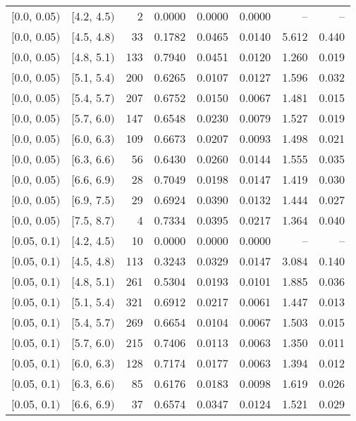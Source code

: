 \begin{longtable}{| l | l | r | r | r | r | r | r |}
        $[$0.0, 0.05$)$ & $[$4.2, 4.5$)$ & 2 & 0.0000 & 0.0000 & 0.0000 & -- & -- \\
        $[$0.0, 0.05$)$ & $[$4.5, 4.8$)$ & 33 & 0.1782 & 0.0465 & 0.0140 & 5.612 & 0.440 \\
        $[$0.0, 0.05$)$ & $[$4.8, 5.1$)$ & 133 & 0.7940 & 0.0451 & 0.0120 & 1.260 & 0.019 \\
        $[$0.0, 0.05$)$ & $[$5.1, 5.4$)$ & 200 & 0.6265 & 0.0107 & 0.0127 & 1.596 & 0.032 \\
        $[$0.0, 0.05$)$ & $[$5.4, 5.7$)$ & 207 & 0.6752 & 0.0150 & 0.0067 & 1.481 & 0.015 \\
        $[$0.0, 0.05$)$ & $[$5.7, 6.0$)$ & 147 & 0.6548 & 0.0230 & 0.0079 & 1.527 & 0.019 \\
        $[$0.0, 0.05$)$ & $[$6.0, 6.3$)$ & 109 & 0.6673 & 0.0207 & 0.0093 & 1.498 & 0.021 \\
        $[$0.0, 0.05$)$ & $[$6.3, 6.6$)$ & 56 & 0.6430 & 0.0260 & 0.0144 & 1.555 & 0.035 \\
        $[$0.0, 0.05$)$ & $[$6.6, 6.9$)$ & 28 & 0.7049 & 0.0198 & 0.0147 & 1.419 & 0.030 \\
        $[$0.0, 0.05$)$ & $[$6.9, 7.5$)$ & 29 & 0.6924 & 0.0390 & 0.0132 & 1.444 & 0.027 \\
        $[$0.0, 0.05$)$ & $[$7.5, 8.7$)$ & 4 & 0.7334 & 0.0395 & 0.0217 & 1.364 & 0.040 \\
        $[$0.05, 0.1$)$ & $[$4.2, 4.5$)$ & 10 & 0.0000 & 0.0000 & 0.0000 & -- & -- \\
        $[$0.05, 0.1$)$ & $[$4.5, 4.8$)$ & 113 & 0.3243 & 0.0329 & 0.0147 & 3.084 & 0.140 \\
        $[$0.05, 0.1$)$ & $[$4.8, 5.1$)$ & 261 & 0.5304 & 0.0193 & 0.0101 & 1.885 & 0.036 \\
        $[$0.05, 0.1$)$ & $[$5.1, 5.4$)$ & 321 & 0.6912 & 0.0217 & 0.0061 & 1.447 & 0.013 \\
        $[$0.05, 0.1$)$ & $[$5.4, 5.7$)$ & 269 & 0.6654 & 0.0104 & 0.0067 & 1.503 & 0.015 \\
        $[$0.05, 0.1$)$ & $[$5.7, 6.0$)$ & 215 & 0.7406 & 0.0113 & 0.0063 & 1.350 & 0.011 \\
        $[$0.05, 0.1$)$ & $[$6.0, 6.3$)$ & 128 & 0.7174 & 0.0177 & 0.0063 & 1.394 & 0.012 \\
        $[$0.05, 0.1$)$ & $[$6.3, 6.6$)$ & 85 & 0.6176 & 0.0183 & 0.0098 & 1.619 & 0.026 \\
        $[$0.05, 0.1$)$ & $[$6.6, 6.9$)$ & 37 & 0.6574 & 0.0347 & 0.0124 & 1.521 & 0.029 \\

\end{longtable}
